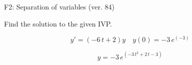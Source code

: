 \begin{exercise}
  \begin{exerciseTitle}F2: Separation of variables (ver. 84)\end{exerciseTitle}
  \begin{exerciseStatement}
    
Find the solution to the given IVP.

    
\[y'=( -6 \, t + 2 )y\hspace{1em} y(0)= -3 \, e^{\left(-3\right)}\]

  \end{exerciseStatement}
  \begin{exerciseAnswer}
    
\[y= -3 \, e^{\left(-3 \, t^{2} + 2 \, t - 3\right)}\]

  \end{exerciseAnswer}
\end{exercise}